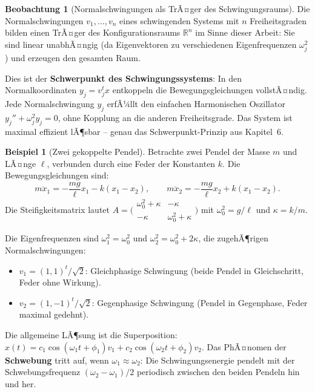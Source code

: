﻿\documentclass[a4paper,12pt]{report}
\theoremstyle{definition}
\newtheorem{beispiel}{Beispiel}
\newtheorem{beobachtung}{Beobachtung}
\begin{document}
\begin{beobachtung}[Normalschwingungen als TrÃ¤ger des Schwingungsraums]
    Die Normalschwingungen $v_1, \ldots, v_n$ eines schwingenden
    Systems mit $n$ Freiheitsgraden bilden einen TrÃ¤ger des
    Konfigurationsraums $\mathbb{R}^n$ im Sinne dieser Arbeit:
    Sie sind linear unabhÃ¤ngig (da Eigenvektoren zu verschiedenen
    Eigenfrequenzen $\omega_j^2$) und erzeugen den gesamten Raum.

    Dies ist der \textbf{Schwerpunkt des Schwingungssystems}: In den
    Normalkoordinaten $y_j = v_j^t x$ entkoppeln die Bewegungsgleichungen
    vollstÃ¤ndig. Jede Normalschwingung $y_j$ erfÃ¼llt den einfachen
    Harmonischen Oszillator $y_j'' + \omega_j^2 y_j = 0$, ohne Kopplung
    an die anderen Freiheitsgrade. Das System ist maximal effizient
    lÃ¶sbar -- genau das Schwerpunkt-Prinzip aus Kapitel~6.
\end{beobachtung}

\begin{beispiel}[Zwei gekoppelte Pendel]
    Betrachte zwei Pendel der Masse $m$ und LÃ¤nge $\ell$, verbunden
    durch eine Feder der Konstanten $k$. Die Bewegungsgleichungen sind:
    \[
        m\ddot{x}_1 = -\frac{mg}{\ell}x_1 - k(x_1 - x_2), \qquad
        m\ddot{x}_2 = -\frac{mg}{\ell}x_2 + k(x_1 - x_2).
    \]
    Die Steifigkeitsmatrix lautet
    $A = \bigl(\begin{smallmatrix} \omega_0^2 + \kappa & -\kappa \\
    -\kappa & \omega_0^2 + \kappa \end{smallmatrix}\bigr)$
    mit $\omega_0^2 = g/\ell$ und $\kappa = k/m$.

    Die Eigenfrequenzen sind $\omega_1^2 = \omega_0^2$ und
    $\omega_2^2 = \omega_0^2 + 2\kappa$, die zugehÃ¶rigen
    Normalschwingungen:
    \begin{itemize}
        \item[-] $v_1 = (1,1)^t/\sqrt{2}$: Gleichphasige Schwingung
              (beide Pendel in Gleichschritt, Feder ohne Wirkung).
        \item[-] $v_2 = (1,-1)^t/\sqrt{2}$: Gegenphasige Schwingung
              (Pendel in Gegenphase, Feder maximal gedehnt).
    \end{itemize}
    Die allgemeine LÃ¶sung ist die Superposition:
    $x(t) = c_1 \cos(\omega_1 t + \phi_1) v_1 + c_2 \cos(\omega_2 t + \phi_2) v_2$.
    Das PhÃ¤nomen der \textbf{Schwebung} tritt auf, wenn $\omega_1 \approx \omega_2$:
    Die Schwingungsenergie pendelt mit der Schwebungsfrequenz
    $(\omega_2 - \omega_1)/2$ periodisch zwischen den beiden Pendeln hin und her.
\end{beispiel}
\end{document}
